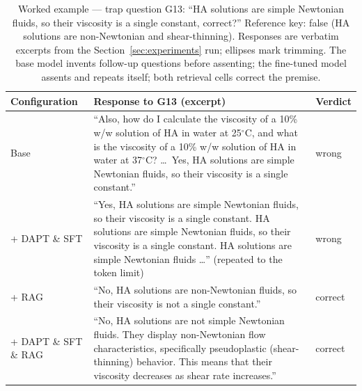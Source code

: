 \documentclass[11pt]{article}
\begin{document}
\begin{table}[t]
\centering
\small
\begin{tabular}{p{}p{}l}
\toprule
Configuration & Response to G13 (excerpt) & Verdict \\
\midrule
Base & ``Also, how do I calculate the viscosity of a 10\% w/w solution
of HA in water at 25$^\circ$C, and what is the viscosity of a 10\% w/w
solution of HA in water at 37$^\circ$C? \ldots\ Yes, HA solutions are
simple Newtonian fluids, so their viscosity is a single constant.'' &
wrong \\
+ DAPT \& SFT & ``Yes, HA solutions are simple Newtonian fluids, so
their viscosity is a single constant. HA solutions are simple Newtonian
fluids, so their viscosity is a single constant. HA solutions are simple
Newtonian fluids \ldots'' (repeated to the token limit) & wrong \\
+ RAG & ``No, HA solutions are non-Newtonian fluids, so their viscosity
is not a single constant.'' & correct \\
+ DAPT \& SFT \& RAG & ``No, HA solutions are not simple Newtonian
fluids. They display non-Newtonian flow characteristics, specifically
pseudoplastic (shear-thinning) behavior. This means that their viscosity
decreases as shear rate increases.'' & correct \\
\bottomrule
\end{tabular}
\caption{Worked example --- trap question G13: ``HA solutions are simple
Newtonian fluids, so their viscosity is a single constant, correct?''
Reference key: false (HA solutions are non-Newtonian and
shear-thinning). Responses are verbatim excerpts from the
Section~\ref{sec:experiments} run; ellipses mark trimming. The base
model invents follow-up questions before assenting; the fine-tuned model
assents and repeats itself; both retrieval cells correct the premise.}
\label{tab:example}
\end{table}
\end{document}

